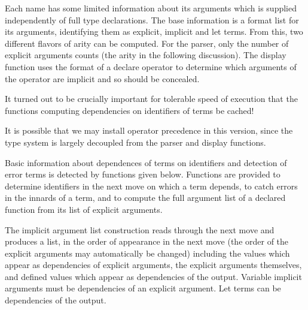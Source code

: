 \documentclass[12pt]{article}
\begin{document}
Each name has some limited information about its arguments which is supplied independently of full type declarations.  The base information is
a format list for its arguments, identifying them as explicit, implicit and let terms.  From this, two different flavors of arity can be computed.  For the parser,
only the number of explicit arguments counts (the arity in the following discussion).    The display function uses the format of a declare operator to determine
which arguments of the operator are implicit and so should be concealed.

It turned out to be crucially important for tolerable speed of execution that the functions computing dependencies on identifiers of terms be cached!

It is possible that we may install operator precedence in this version, since the type system is largely decoupled from the parser and display functions.

Basic information about dependences of terms on identifiers and detection of error terms is detected by functions given below.  Functions are provided to determine identifiers
in the next move on which a term depends, to catch errors in the innards of a term, and to compute the full argument list of a declared function from its list of explicit arguments.

The implicit argument list construction reads through the next move and produces a list, in the order of appearance in the next move (the order of the explicit arguments may automatically be changed) including the values which appear as dependencies of explicit arguments, the explicit arguments themselves, and defined values which appear as dependencies of the output.  Variable implicit arguments must be dependencies of an explicit argument.  Let terms can be dependencies of the output.
\end{document}
